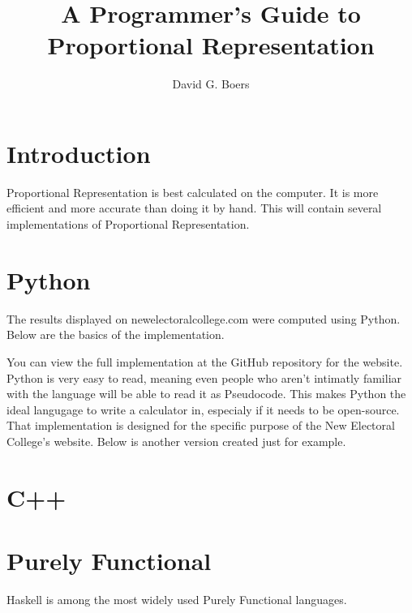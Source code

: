 \documentclass{article}
\title{A Programmer's Guide to Proportional Representation}
\author{David G. Boers}
\begin{document}
    \maketitle
    
    \section{Introduction}

    Proportional Representation is best calculated on the computer. It is more efficient and more accurate than doing it by hand. This will contain several implementations of Proportional Representation.

    \section{Python}

    The results displayed on newelectoralcollege.com were computed using Python. Below are the basics of the implementation.

    

    You can view the full implementation at the GitHub repository for the website.\\

    Python is very easy to read, meaning even people who aren't intimatly familiar with the language will be able to read it as Pseudocode. This makes Python the ideal langugage to write a calculator in, especialy if it needs to be open-source.\\

    That implementation is designed for the specific purpose of the New Electoral College's website. Below is another version created just for example.

    

    \section{C++}

    

    \section{Purely Functional}

    Haskell is among the most widely used Purely Functional languages.
\end{document}

